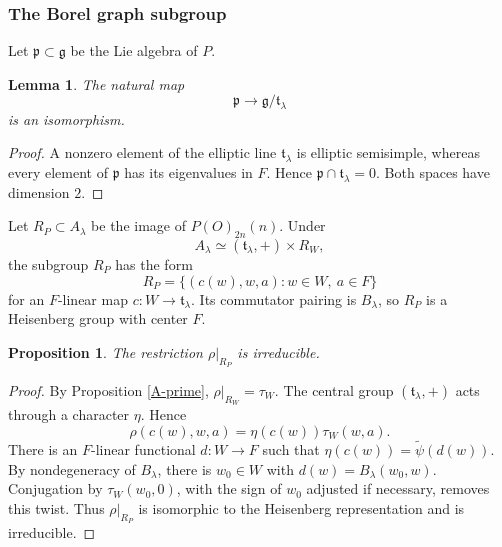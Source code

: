 \documentclass[11pt,a4paper,twoside]{amsart}
\newtheorem{lemma}[theorem]{Lemma}
\newtheorem{proposition}[theorem]{Proposition}
\theoremstyle{definition}
\theoremstyle{remark}
\newcommand{\tori}{\mathfrak t}
\newcommand{\bl}{\lambda}
\newcommand{\fg}{\mathfrak g}
\begin{document}
\subsubsection{The Borel graph subgroup}
Let $\mathfrak p\subset\fg$ be the Lie algebra of $P$.
\begin{lemma}\label{p-to-W}
The natural map
$$
\mathfrak p\longrightarrow\fg/\tori_\bl
$$
is an isomorphism.
\end{lemma}
\begin{proof}
A nonzero element of the elliptic line $\tori_\bl$ is elliptic semisimple, whereas every element of $\mathfrak p$ has its eigenvalues in $F$. Hence $\mathfrak p\cap\tori_\bl=0$. Both spaces have dimension $2$.
\end{proof}
Let $R_P\subset A_\bl$ be the image of $P(O)_{2n}(n)$. Under
$$
A_\bl\simeq(\tori_\bl,+)\times R_W,
$$
the subgroup $R_P$ has the form
$$
R_P=\{(c(w),w,a):w\in W,\ a\in F\}
$$
for an $F$-linear map $c:W\to\tori_\bl$. Its commutator pairing is $B_\bl$, so $R_P$ is a Heisenberg group with center $F$.
\begin{proposition}\label{RP-irred}
The restriction $\rho|_{R_P}$ is irreducible.
\end{proposition}
\begin{proof}
By Proposition \ref{A-prime}, $\rho|_{R_W}=\tau_W$. The central group $(\tori_\bl,+)$ acts through a character $\eta$. Hence
$$
\rho(c(w),w,a)=\eta(c(w))\tau_W(w,a).
$$
There is an $F$-linear functional $d:W\to F$ such that $\eta(c(w))=\widetilde\psi(d(w))$. By nondegeneracy of $B_\bl$, there is $w_0\in W$ with $d(w)=B_\bl(w_0,w)$. Conjugation by $\tau_W(w_0,0)$, with the sign of $w_0$ adjusted if necessary, removes this twist. Thus $\rho|_{R_P}$ is isomorphic to the Heisenberg representation and is irreducible.
\end{proof}
\end{document}
